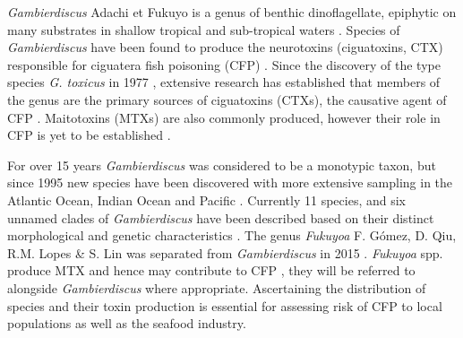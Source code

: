 \documentclass[12pt]{article}
\begin{document}
\emph{Gambierdiscus} Adachi et Fukuyo is a genus of benthic dinoflagellate, epiphytic on many substrates in shallow tropical and sub-tropical waters \citep{marine2014}. Species of \emph{Gambierdiscus} have been found to produce the neurotoxins (ciguatoxins, CTX) responsible for ciguatera fish poisoning (CFP) \citep{berdalet2012global}. 
Since the discovery of the type species \emph{G. toxicus} in 1977 \citep{yasumoto1977finding}, extensive research has established that members of the genus are the primary sources of ciguatoxins (CTXs), the causative agent of CFP \citep{chinain1997intraspecific,holmes1998gambierdiscus}. Maitotoxins (MTXs) are also commonly produced, however their role in CFP is yet to be established \citep{kohli2014feeding}. 

For over 15 years \emph{Gambierdiscus} was considered to be a monotypic taxon, but since 1995 new species have been discovered with more extensive sampling in the Atlantic Ocean, Indian Ocean and Pacific \citep{faust1995observation,holmes1998gambierdiscus,litaker2009taxonomy,chinain1999morphology,fraga2011gambierdiscus,nishimura2014morphology}.
Currently 11 species, and six unnamed clades of \emph{Gambierdiscus} have been described based on their distinct morphological and genetic characteristics \citep{adachi1979thecal,faust1995observation,chinain1999morphology,litaker2009taxonomy,nishimura2014morphology,fraga2011gambierdiscus}.  
The genus \emph{Fukuyoa} F. Gómez, D. Qiu, R.M. Lopes \& S. Lin was separated from \emph{Gambierdiscus} in 2015 \citep{gomez2015fukuyoa}. \emph{Fukuyoa} spp. produce MTX \citep{holmes1998gambierdiscus,holland2013differences} and hence may contribute to CFP \citep{kohli2014feeding}, they will be referred to alongside \emph{Gambierdiscus} where appropriate.
Ascertaining the distribution of species and their toxin production is essential for assessing risk of CFP to local populations as well as the seafood industry.
\end{document}
